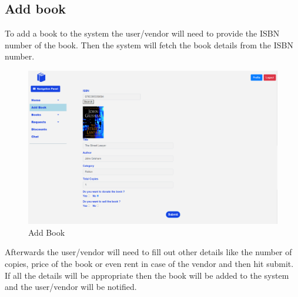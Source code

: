 \documentclass[conference]{IEEEtran}
\begin{document}
\subsection{Add book}
To add a book to the system the user/vendor will need to provide the ISBN number of the book. Then the system will fetch the book details from the ISBN number. 
\begin{figure}[h]
     \centering
     \includegraphics[scale=0.20,margin=2,frame]{addbook.png}
     \caption{Add Book}
     \label{fig:addbook}
 \end{figure}
Afterwards the user/vendor will need to fill out other details like the number of copies, price of the book or even rent in case of the vendor and then hit submit. If all the details will be appropriate then the book will be added to the system and the user/vendor will be notified.  
\end{document}
